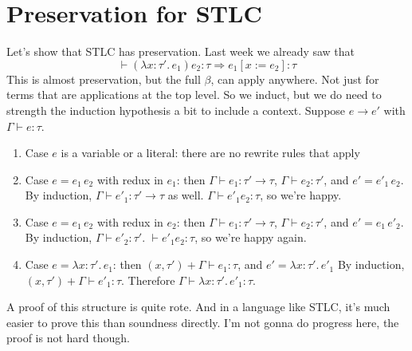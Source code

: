 \documentclass[12pt]{article}
\begin{document}
\section{Preservation for STLC}
Let's show that STLC has preservation.
Last week we already saw that
\[
\vdash (\lambda x:\tau'.\, e_1) e_2 : \tau \Longrightarrow e_1[x:=e_2] : \tau
\]
This is almost preservation, but the full $\beta$, can apply anywhere.
Not just for terms that are applications at the top level.
So we induct, but we do need to strength the induction hypothesis a bit to include a context.
Suppose $e \rightarrow e'$ with $\Gamma\vdash e : \tau$. 
\begin{enumerate}
    \item Case $e$ is a variable or a literal: there are no rewrite rules that apply
    \item Case $e = e_1\, e_2$ with redux in $e_1$:
          then $\Gamma\vdash e_1 : \tau' \rightarrow \tau$, $\Gamma\vdash e_2 : \tau'$, and
           $e' = e'_1\, e_2$. 
          By induction, $\Gamma\vdash e'_1 : \tau' \rightarrow \tau$ as well. 
          $\Gamma\vdash e'_1 e_2 : \tau$, so we're happy.
    \item Case $e = e_1\, e_2$ with redux in $e_2$:
          then $\Gamma\vdash e_1 : \tau' \rightarrow \tau$, $\Gamma\vdash e_2 : \tau'$, and
           $e' = e_1\, e'_2$. 
          By induction, $\Gamma\vdash e'_2 : \tau'$. 
          $\vdash e'_1 e_2 : \tau$, so we're happy again.
    \item Case $e = \lambda x:\tau'.\, e_1$:
          then $(x,\tau') + \Gamma\vdash e_1 : \tau$, and $e' = \lambda x:\tau'.\, e'_1$
          By induction, $(x,\tau') + \Gamma\vdash e'_1 : \tau$.
          Therefore $\Gamma\vdash \lambda x:\tau'.\, e'_1 : \tau$.
\end{enumerate}
A proof of this structure is quite rote.
And in a language like STLC, it's much easier to prove this than soundness directly.
I'm not gonna do progress here, the proof is not hard though.
\end{document}
